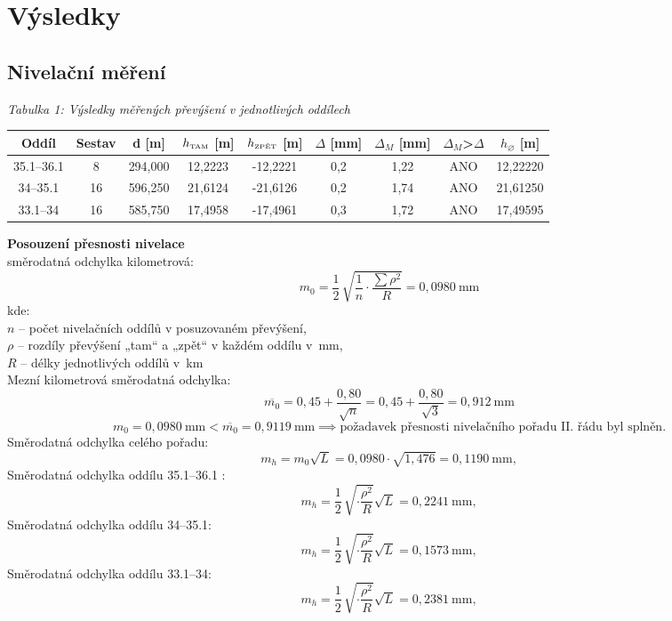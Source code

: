 \section{Výsledky}

\subsection{Nivelační měření}

\begin{table}[H]
    \centering
    \textit{Tabulka 1: Výsledky měřených převýšení v jednotlivých oddílech}
    
    \begin{tabular}{|c|c|c|c|c|c|c|c|c|}
        \hline
        \textbf{Oddíl} & \textbf{Sestav} & d [m] & $h_{\text{\tiny{TAM}}}$ [m] & $h_{\text{\tiny{ZPĚT}}}$ [m] & $\Delta$ [mm] & $\Delta_M$ [mm] & $\Delta_M$>$\Delta$ & $h_{\diameter}$ [m] \\
        \hline \hline
        35.1–36.1 & 8  & 294,000 & 12,2223 & -12,2221 & 0,2 & 1,22 & ANO & 12,22220\\ \hline
        34–35.1 & 16 & 596,250 & 21,6124 & -21,6126 & 0,2 & 1,74 & ANO & 21,61250\\ \hline 
        33.1–34 & 16 & 585,750 & 17,4958 & -17,4961 & 0,3 & 1,72 & ANO & 17,49595\\ \hline
    \end{tabular}
\end{table}
\textbf{Posouzení přesnosti nivelace}\\
směrodatná odchylka kilometrová:
\[
  m_0 = \frac{1}{2}\,
         \sqrt{ \frac{1}{n}
                 \cdot
                 \frac{ \sum \rho^2 }{ R } }
      = 0{,}0980\ \mathrm{mm}
\]
kde:\\
$n$ – počet nivelačních oddílů v posuzovaném převýšení,\\
$\rho$ – rozdíly převýšení „tam“ a „zpět“ v každém oddílu v~mm,\\
$R$ – délky jednotlivých oddílů v~km\\
Mezní kilometrová směrodatná odchylka:
\[
  \overline{m_0}
     = 0{,}45 + \frac{0{,}80}{\sqrt{n}}
     = 0{,}45 + \frac{0{,}80}{\sqrt{3}}
     = 0{,}912\ \mathrm{mm}
\]
\[
  m_0 = 0{,}0980\ \mathrm{mm}
        < \overline{m_0} = 0{,}9119\ \mathrm{mm} \implies
\text{požadavek přesnosti nivelačního pořadu II.~řádu byl splněn.}\]
Směrodatná odchylka celého pořadu:
\[
  m_h = m_0 \sqrt{L}
       = 0{,}0980 \cdot \sqrt{1{,}476}
       = 0{,}1190\ \mathrm{mm},
\]
Směrodatná odchylka oddílu 35.1–36.1 :
\[
  m_h = \frac{1}{2}\,
         \sqrt{
                 \cdot
                 \frac{ \rho^2 }{ R } } \sqrt{L} = 0{,}2241\ \mathrm{mm},
\]
Směrodatná odchylka oddílu 34–35.1:
\[
  m_h = \frac{1}{2}\,
         \sqrt{
                 \cdot
                 \frac{ \rho^2 }{ R } } \sqrt{L} = 0{,}1573\ \mathrm{mm},
\]
Směrodatná odchylka oddílu 33.1–34:
\[
  m_h = \frac{1}{2}\,
         \sqrt{
                 \cdot
                 \frac{ \rho^2 }{ R } } \sqrt{L} = 0{,}2381\ \mathrm{mm},
\]


